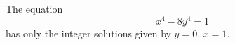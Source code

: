 \begin{proposition}
    The equation
\[
    x^4-8y^4=1
\]
    has only the integer solutions given by $y=0$, $x=1$.
\end{proposition}
